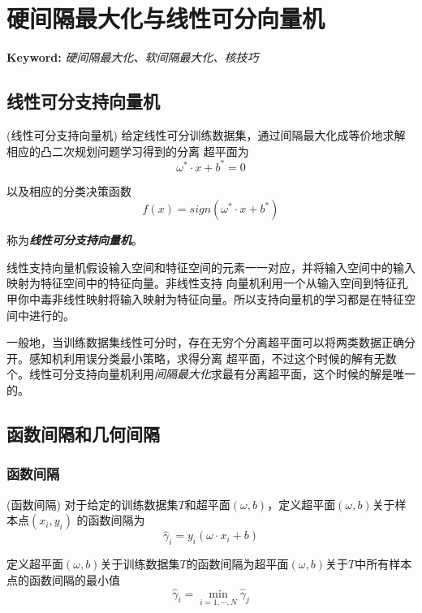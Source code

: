 \chapter{硬间隔最大化与线性可分向量机}

\textbf{Keyword: } \textsl{硬间隔最大化、软间隔最大化、核技巧}

\section{线性可分支持向量机}

\begin{define}
    (线性可分支持向量机) 给定线性可分训练数据集，通过间隔最大化成等价地求解相应的凸二次规划问题学习得到的分离
    超平面为
    \begin{equation}
        \omega^*\cdot x+b^*=0
    \end{equation}

    以及相应的分类决策函数
    \begin{equation}
        f(x)=sign( \omega^*\cdot x+b^*)
    \end{equation}

    称为\textsl{\textbf{线性可分支持向量机}}。
\end{define}

线性支持向量机假设输入空间和特征空间的元素一一对应，并将输入空间中的输入映射为特征空间中的特征向量。非线性支持
向量机利用一个从输入空间到特征孔甲你中毒非线性映射将输入映射为特征向量。所以支持向量机的学习都是在特征空间中进行的。

一般地，当训练数据集线性可分时，存在无穷个分离超平面可以将两类数据正确分开。感知机利用误分类最小策略，求得分离
超平面，不过这个时候的解有无数个。线性可分支持向量机利用\textsl{间隔最大化}求最有分离超平面，这个时候的解是唯一的。

\section{函数间隔和几何间隔}

\subsection*{函数间隔}

\begin{define}
    (函数间隔) 对于给定的训练数据集$T$和超平面$(\omega,b)$，定义超平面$(\omega,b)$关于样本点$(x_i,y_i)$
    的函数间隔为
    \begin{equation}
        \hat{\gamma}_i=y_i(\omega\cdot x_i+b)
    \end{equation}

    定义超平面$(\omega,b)$关于训练数据集$T$的函数间隔为超平面$(\omega,b)$关于$T$中所有样本点的函数间隔的最小值
    \begin{equation}
        \hat{\gamma}_i=\min\limits_{i=1,\cdots,N} \hat{\gamma}_j
    \end{equation}
\end{define}

